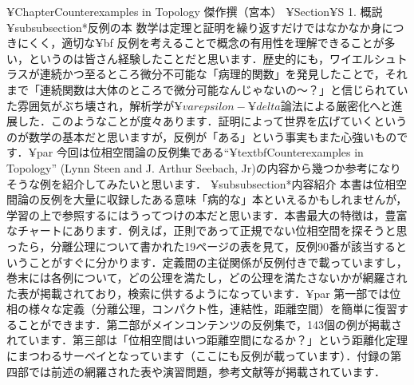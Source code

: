 ¥Chapter{Counterexamples in Topology 傑作撰（宮本）}
¥Section{¥S 1. 概説}
¥subsubsection*{反例の本}
数学は定理と証明を繰り返すだけではなかなか身につきにくく，適切な{¥bf 反例}を考えることで概念の有用性を理解できることが多い，というのは皆さん経験したことだと思います．歴史的にも，ワイエルシュトラスが連続かつ至るところ微分不可能な「病理的関数」を発見したことで，それまで「連続関数は大体のところで微分可能なんじゃないの〜？」と信じられていた雰囲気がぶち壊され，解析学が$¥varepsilon - ¥delta$論法による厳密化へと進展した．このようなことが度々あります．証明によって世界を広げていくというのが数学の基本だと思いますが，反例が「ある」という事実もまた心強いものです．¥par
今回は位相空間論の反例集である``¥textbf{Counterexamples in Topology}''  (Lynn Steen and J. Arthur Seebach, Jr)の内容から幾つか参考になりそうな例を紹介してみたいと思います．
¥subsubsection*{内容紹介}
本書は位相空間論の反例を大量に収録したある意味「病的な」本といえるかもしれませんが，学習の上で参照するにはうってつけの本だと思います．本書最大の特徴は，豊富なチャートにあります．例えば，正則であって正規でない位相空間を探そうと思ったら，分離公理について書かれた19ページの表を見て，反例90番が該当するということがすぐに分かります．定義間の主従関係が反例付きで載っていますし，巻末には各例について，どの公理を満たし，どの公理を満たさないかが網羅された表が掲載されており，検索に供するようになっています．¥par
第一部では位相の様々な定義（分離公理，コンパクト性，連結性，距離空間）を簡単に復習することができます．第二部がメインコンテンツの反例集で，143個の例が掲載されています．第三部は「位相空間はいつ距離空間になるか？」という距離化定理にまつわるサーベイとなっています（ここにも反例が載っています）．付録の第四部では前述の網羅された表や演習問題，参考文献等が掲載されています．

